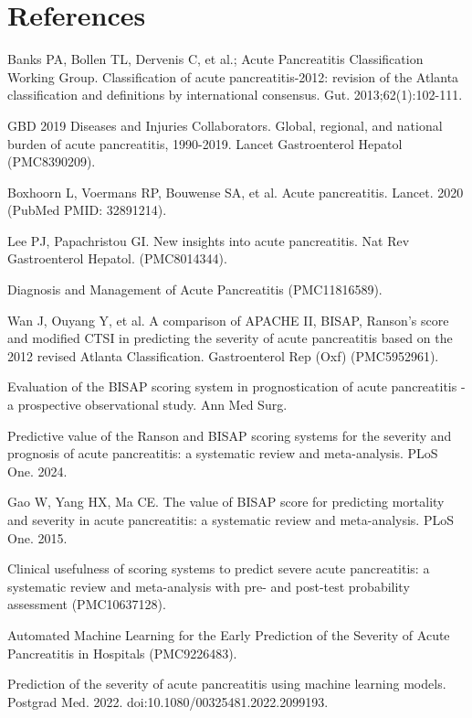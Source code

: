 \documentclass[10pt]{article} %
\begin{document}
\section*{References}
\begin{small}
\noindent [1] Banks PA, Bollen TL, Dervenis C, et al.; Acute Pancreatitis Classification Working Group. Classification of acute pancreatitis-2012: revision of the Atlanta classification and definitions by international consensus. Gut. 2013;62(1):102-111.

\noindent [2] GBD 2019 Diseases and Injuries Collaborators. Global, regional, and national burden of acute pancreatitis, 1990-2019. Lancet Gastroenterol Hepatol (PMC8390209).

\noindent [3] Boxhoorn L, Voermans RP, Bouwense SA, et al. Acute pancreatitis. Lancet. 2020 (PubMed PMID: 32891214).

\noindent [4] Lee PJ, Papachristou GI. New insights into acute pancreatitis. Nat Rev Gastroenterol Hepatol. (PMC8014344).

\noindent [5] Diagnosis and Management of Acute Pancreatitis (PMC11816589).

\noindent [6] Wan J, Ouyang Y, et al. A comparison of APACHE II, BISAP, Ranson's score and modified CTSI in predicting the severity of acute pancreatitis based on the 2012 revised Atlanta Classification. Gastroenterol Rep (Oxf) (PMC5952961).

\noindent [7] Evaluation of the BISAP scoring system in prognostication of acute pancreatitis - a prospective observational study. Ann Med Surg.

\noindent [8] Predictive value of the Ranson and BISAP scoring systems for the severity and prognosis of acute pancreatitis: a systematic review and meta-analysis. PLoS One. 2024.

\noindent [9] Gao W, Yang HX, Ma CE. The value of BISAP score for predicting mortality and severity in acute pancreatitis: a systematic review and meta-analysis. PLoS One. 2015.

\noindent [10] Clinical usefulness of scoring systems to predict severe acute pancreatitis: a systematic review and meta-analysis with pre- and post-test probability assessment (PMC10637128).

\noindent [11] Automated Machine Learning for the Early Prediction of the Severity of Acute Pancreatitis in Hospitals (PMC9226483).

\noindent [12] Prediction of the severity of acute pancreatitis using machine learning models. Postgrad Med. 2022. doi:10.1080/00325481.2022.2099193.


\end{small}
\end{document}
